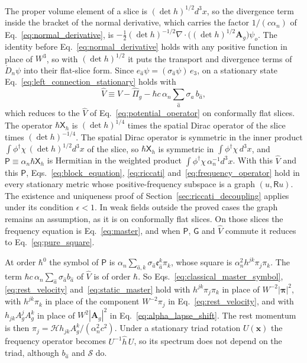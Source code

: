 \documentclass[aps,prd,onecolumn,tightenlines,nofootinbib,notitlepage,11pt,floatfix]{revtex4-2}
\theoremstyle{indentedtheorem}
\begin{document}
The proper volume element of a slice is $(\det h)^{1/2}d^3x$, so the divergence term inside the bracket of the normal derivative, which carries the factor $1/(c\alpha_n)$ of Eq.~\eqref{eq:normal_derivative}, is $-\tfrac{1}{2}(\det h)^{-1/2}\nabla\cdot\big((\det h)^{1/2}\mathbf{A}_g\big)\psi_o$. The identity before Eq.~\eqref{eq:normal_derivative} holds with any positive function in place of $W^3$, so with $(\det h)^{1/2}$ it puts the transport and divergence terms of $\mathring{D}_n\psi$ into their flat-slice form. Since $e_{\hat{a}}\psi=(\sigma_{\hat{a}}\psi)\,e_3$, on a stationary state Eq.~\eqref{eq:left_connection_stationary} holds with
\begin{equation*}
    \hat{V} \equiv V - \hat{\Pi}_g - \hbar c\,\alpha_n\sum_{\hat{a}}\sigma_{\hat{a}}\,b_{\hat{a}} ,
\end{equation*}
which reduces to the $\hat{V}$ of Eq.~\eqref{eq:potential_operator} on conformally flat slices. The operator $\hbar\mathsf{X}_h$ is $(\det h)^{1/4}$ times the spatial Dirac operator of the slice times $(\det h)^{-1/4}$. The spatial Dirac operator is symmetric in the inner product $\int\phi^\dagger\chi\,(\det h)^{1/2}d^3x$ of the slice, so $\hbar\mathsf{X}_h$ is symmetric in $\int\phi^\dagger\chi\,d^3x$, and $\mathsf{P}\equiv\alpha_n\hbar\mathsf{X}_h$ is Hermitian in the weighted product $\int\phi^\dagger\chi\,\alpha_n^{-1}d^3x$. With this $\hat{V}$ and this $\mathsf{P}$, Eqs.~\eqref{eq:block_equation}, \eqref{eq:riccati} and~\eqref{eq:frequency_operator} hold in every stationary metric whose positive-frequency subspace is a graph $(u,\mathsf{R}u)$. The existence and uniqueness proof of Section~\ref{sec:riccati_decoupling} applies under its condition $\epsilon<1$. In weak fields outside the proved cases the graph remains an assumption, as it is on conformally flat slices. On those slices the frequency equation is Eq.~\eqref{eq:master}, and when $\mathsf{P}$, $\mathsf{G}$ and $\hat{V}$ commute it reduces to Eq.~\eqref{eq:pure_square}.

At order $\hbar^0$ the symbol of $\mathsf{P}$ is $\alpha_n\sum_{\hat{a},k}\sigma_{\hat{a}}\mathfrak{e}_{\hat{a}}^k\pi_k$, whose square is $\alpha_n^2h^{jk}\pi_j\pi_k$. The term $\hbar c\,\alpha_n\sum_{\hat{a}}\sigma_{\hat{a}}b_{\hat{a}}$ of $\hat{V}$ is of order $\hbar$. So Eqs.~\eqref{eq:classical_master_symbol}, \eqref{eq:rest_velocity} and~\eqref{eq:static_master} hold with $h^{jk}\pi_j\pi_k$ in place of $W^{-2}|\boldsymbol{\pi}|^2$, with $h^{jk}\pi_k$ in place of the component $W^{-2}\pi_j$ in Eq.~\eqref{eq:rest_velocity}, and with $h_{jk}A_g^jA_g^k$ in place of $W^2|\mathbf{A}_g|^2$ in Eq.~\eqref{eq:alpha_lapse_shift}. The rest momentum is then $\pi_j=\mathcal{H}h_{jk}A_g^k/(\alpha_n^2c^2)$. Under a stationary triad rotation $U(\mathbf{x})$ the frequency operator becomes $U^{-1}\hat{h}\,U$, so its spectrum does not depend on the triad, although $b_{\hat{a}}$ and $\mathcal{S}$ do.
\end{document}
